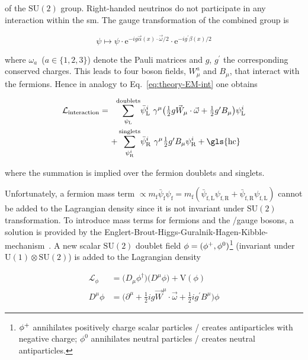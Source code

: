 of the $\mathrm{SU(2)}$ group. Right-handed neutrinos do not participate in any interaction within the \gls{sm}. The gauge transformation of the combined group is

\begin{equation}
\psi\mapsto\psi\cdot\mathrm{e}^{-ig\vec{\alpha}(x)\cdot\vec{\omega}/2}\cdot\mathrm{e}^{-ig^{\prime}\beta(x)/2} \label{eq:theory-u1su2-transformation}
\end{equation}

where $\omega_{a}$~($a\in\{1,2,3\}$) denote the Pauli matrices and $g$, $g^{\prime}$ the corresponding conserved charges. This leads to four boson fields, $W^{a}_{\mu}$ and $B_{\mu}$, that interact with the fermions. Hence in analogy to Eq.~\ref{eq:theory-EM-int} one obtains

\begin{align}
\mathcal{L}_\mathrm{interaction}=~~\sum_{\psi_\mathrm{L}}^\mathrm{doublets}&\bar{\psi}^{i}_\mathrm{L}~\gamma^{\mu}\big(\tfrac{1}{2}g\vec{W}_{\mu}\cdot\vec{\omega}+\tfrac{1}{2}g^{\prime}B_{\mu}\big)\psi^{i}_\mathrm{L} \nonumber\\
+\sum_{\psi^{i}_\mathrm{R}}^\mathrm{singlets}&\bar{\psi}^{i}_\mathrm{R}~\gamma^{\mu}\tfrac{1}{2}g^{\prime}B_{\mu}\psi^{i}_\mathrm{R} + \mathrm{\gls{hc}} \label{eq:theory-codev-su2-interaction}
\end{align}

where the summation is implied over the fermion doublets and singlets.

Unfortunately, a fermion mass term $\propto m_\mathrm{f}\bar{\psi}_\mathrm{f}\psi_\mathrm{f}=m_\mathrm{f}(\bar{\psi}_\mathrm{f,L}\psi_\mathrm{f,R}+\bar{\psi}_\mathrm{f,R}\psi_\mathrm{f,L})$ cannot be added to the Lagrangian density since it is not invariant under $\mathrm{SU(2)}$ transformation. To introduce mass terms for fermions and the \wboson/\zboson gauge bosons, a solution is provided by the Englert-Brout-Higgs-Guralnik-Hagen-Kibble-mechanism~\cite{HIGGS1964132,PhysRevLett.13.508,PhysRevLett.13.321,PhysRevLett.13.585}. A new scalar $\mathrm{SU(2)}$ doublet field $\phi=(\phi^{+},\phi^{0})$\footnote{$\phi^{+}$ annihilates positively charge scalar particles / creates antiparticles with negative charge; $\phi^{0}$ annihilates neutral particles / creates neutral antiparticles.} (invariant under $\mathrm{U(1)}\otimes\mathrm{SU(2)}$) is added to the Lagrangian density

\begin{align}
\mathcal{L}_{\phi}&=\big(D_{\mu}\phi^{\dagger}\big)\big(D^{\mu}\phi\big)+\mathrm{V}(\phi) \label{eq:theory-phi-propagator} \\
D^{\mu}\phi&=\big(\partial^{\mu}+\tfrac{1}{2}ig\vec{W}^{\mu}\cdot\vec{\omega}+\tfrac{1}{2}ig^{\prime}B^{\mu}\big)\phi \label{eq:theory-phi-codev}
\end{align}

